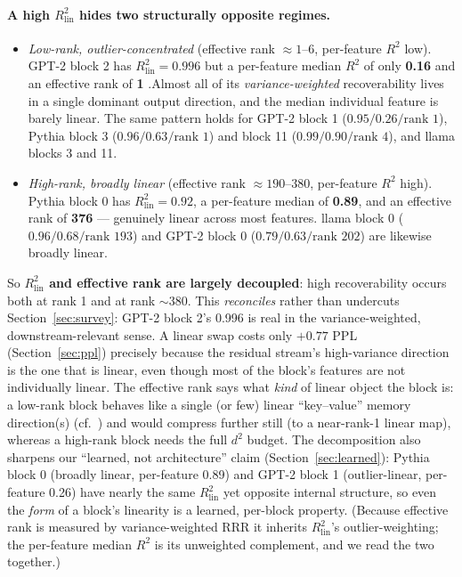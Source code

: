 \documentclass{article}
\newcommand{\Rlin}{R^2_{\mathrm{lin}}}
\begin{document}
\paragraph{A high $\Rlin$ hides two structurally opposite regimes.}
\begin{itemize}
\item \emph{Low-rank, outlier-concentrated} (effective rank $\approx 1$--$6$, per-feature $R^2$
  low). GPT-2 block 2 has $\Rlin = 0.996$ but a per-feature median $R^2$ of only \textbf{0.16}
  and an effective rank of \textbf{1} .Almost all of its \emph{variance-weighted}
  recoverability lives in a single dominant output direction, and the median individual feature
  is barely linear. The same pattern holds for GPT-2 block 1 ($0.95 / 0.26 / \text{rank }1$),
  Pythia block 3 ($0.96 / 0.63 / \text{rank }1$) and block 11 ($0.99 / 0.90 / \text{rank }4$),
  and llama blocks 3 and 11.
\item \emph{High-rank, broadly linear} (effective rank $\approx 190$--$380$, per-feature $R^2$
  high). Pythia block 0 has $\Rlin = 0.92$, a per-feature median of \textbf{0.89}, and an
  effective rank of \textbf{376} --- genuinely linear across most features. llama block 0
  ($0.96 / 0.68 / \text{rank }193$) and GPT-2 block 0 ($0.79 / 0.63 / \text{rank }202$) are
  likewise broadly linear.
\end{itemize}
So \textbf{$\Rlin$ and effective rank are largely decoupled}: high recoverability occurs both at
rank 1 and at rank ${\sim}380$. This \emph{reconciles} rather than undercuts
Section~\ref{sec:survey}: GPT-2 block 2's 0.996 is real in the variance-weighted,
downstream-relevant sense. A linear swap costs only $+0.77$ PPL (Section~\ref{sec:ppl})
precisely because the residual stream's high-variance direction is the one that is linear, even though most of the block's features are not individually linear. The effective rank says
what \emph{kind} of linear object the block is: a low-rank block behaves like a single (or few)
linear ``key--value'' memory direction(s) (cf.\ \citealp{geva2021kv}) and would compress further
still (to a near-rank-1 linear map), whereas a high-rank block needs the full $d^2$ budget.
The decomposition also sharpens our ``learned, not architecture'' claim (Section~\ref{sec:learned}):
Pythia block 0 (broadly linear, per-feature 0.89) and GPT-2 block 1 (outlier-linear, per-feature
0.26) have nearly the same $\Rlin$ yet opposite internal structure, so even the \emph{form} of a
block's linearity is a learned, per-block property. (Because effective rank is measured by
variance-weighted RRR it inherits $\Rlin$'s outlier-weighting; the per-feature median $R^2$ is
its unweighted complement, and we read the two together.)
\end{document}
